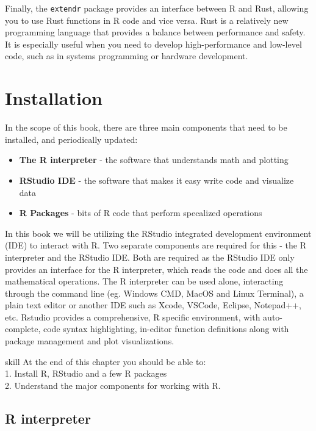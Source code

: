 \documentclass[
]{book}
\begin{document}
Finally, the \texttt{extendr} package provides an interface between R and Rust, allowing you to use Rust functions in R code and vice versa. Rust is a relatively new programming language that provides a balance between performance and safety. It is especially useful when you need to develop high-performance and low-level code, such as in systems programming or hardware development.

\hypertarget{installation}{%
\chapter{Installation}\label{installation}}

In the scope of this book, there are three main components that need to be installed, and periodically updated:

\begin{itemize}
\item
  \textbf{The R interpreter} - the software that understands math and plotting
\item
  \textbf{RStudio IDE} - the software that makes it easy write code and visualize data
\item
  \textbf{R Packages} - bits of R code that perform specalized operations
\end{itemize}

In this book we will be utilizing the RStudio integrated development environment (IDE) to interact with R. Two separate components are required for this - the R interpreter and the RStudio IDE. Both are required as the RStudio IDE only provides an interface for the R interpreter, which reads the code and does all the mathematical operations. The R interpreter can be used alone, interacting through the command line (eg. Windows CMD, MacOS and Linux Terminal), a plain text editor or another IDE such as Xcode, VSCode, Eclipse, Notepad++, etc. Rstudio provides a comprehensive, R specific environment, with auto-complete, code syntax highlighting, in-editor function definitions along with package management and plot visualizations.

\begin{infobox}{skill}
At the end of this chapter you should be able to:\\
1. Install R, RStudio and a few R packages\\
2. Understand the major components for working with R.

\end{infobox}

\hypertarget{r-interpreter}{%
\section{R interpreter}\label{r-interpreter}}
\end{document}
